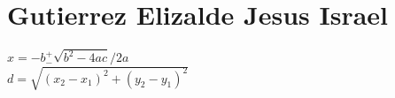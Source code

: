 \chapter{Gutierrez Elizalde Jesus Israel}


$x={-b^{+}_{-} \sqrt{b^{2}-4ac}}/2a$\\

$d= \sqrt{(x_{2}-x_{1})^{2}+(y_{2}-y_{1})^{2}} $\\



